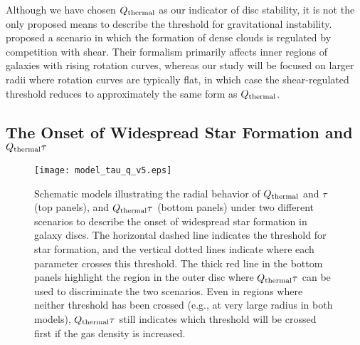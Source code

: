 \documentclass[fleqn,usenatbib]{mnras}
\newcommand{\qh}{Q_{\rm thermal}}
\begin{document}
Although we have chosen $\qh$ as our indicator of disc stability, it is not the only proposed means to describe the threshold for gravitational instability.  \citet{Hunter98} proposed a scenario in which the formation of dense clouds is regulated by competition with shear.  Their formalism primarily affects inner regions of galaxies with rising rotation curves, whereas our study will be focused on larger radii where rotation curves are typically flat, in which case the shear-regulated threshold reduces to approximately the same form as $\qh$.  

\subsection{The Onset of Widespread Star Formation and $\qh\tau$}
\label{sec:qtau_model}

\begin{figure}
	\texttt{[image: model\_tau\_q\_v5.eps]}
	\caption{Schematic models illustrating the radial behavior of $\qh$ and $\tau$ (top panels), and $\qh\tau$ (bottom panels) under two different scenarios to describe the onset of widespread star formation in galaxy discs. The horizontal dashed line indicates the threshold for star formation, and the vertical dotted lines indicate where each parameter crosses this threshold.  The thick red line in the bottom panels highlight the region in the outer disc where $\qh\tau$ can be used to discriminate the two scenarios. Even in regions where neither threshold has been crossed (e.g., at very large radius in both models), $\qh\tau$ still indicates which threshold will be crossed first if the gas density is increased.}
\label{fig:tau_q_model}
\end{figure}
\end{document}
